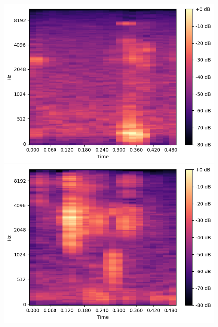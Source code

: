 \begin{figure}[t]
    \begin{minipage}[b]{0.16\hsize}
        \centering
        \includegraphics[width=\hsize]{img/melspec/chicken.png}
    \end{minipage}
    \begin{minipage}[b]{0.16\hsize}
        \centering
        \includegraphics[width=\hsize]{img/melspec/rice.png}
    \end{minipage}
    \begin{minipage}[b]{0.16\hsize}
        \centering

\end{minipage}
\end{figure}
